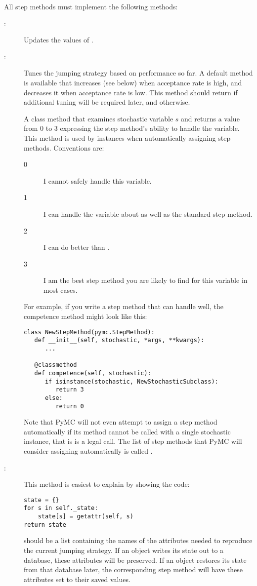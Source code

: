 All step methods must implement the following methods:
\begin{description}
   \item[:] Updates the values of .
   \item[:] Tunes the jumping strategy based on performance so far. A default method is available that increases  (see below) when acceptance rate is high, and decreases it when acceptance rate is low. This method should return  if additional tuning will be required later, and  otherwise.
   \item[] A class method that examines stochastic variable $s$ and returns a value from 0 to 3 expressing the step method's ability to handle the variable. This method is used by  instances when automatically assigning step methods. Conventions are:
   \begin{description}
      \item[0] I cannot safely handle this variable.
      \item[1] I can handle the variable about as well as the standard  step method.
      \item[2] I can do better than .
      \item[3] I am the best step method you are likely to find for this variable in most cases.
   \end{description}
   For example, if you write a step method that can handle  well, the competence method might look like this:
\begin{verbatim}
class NewStepMethod(pymc.StepMethod):
   def __init__(self, stochastic, *args, **kwargs):
      ...

   @classmethod
   def competence(self, stochastic):
      if isinstance(stochastic, NewStochasticSubclass):
         return 3
      else:
         return 0
\end{verbatim}
   Note that PyMC will not even attempt to assign a step method automatically if its  method cannot be called with a single stochastic instance, that is  is a legal call. The list of step methods that PyMC will consider assigning automatically is called .
   \item[:] This method is easiest to explain by showing the code:
   \begin{verbatim}
state = {}
for s in self._state:
    state[s] = getattr(self, s)
return state
   \end{verbatim}
    should be a list containing the names of the attributes needed to reproduce the current jumping strategy. If an  object writes its state out to a database, these attributes will be preserved. If an  object restores its state from that database later, the corresponding step method will have these attributes set to their saved values.
\end{description}

